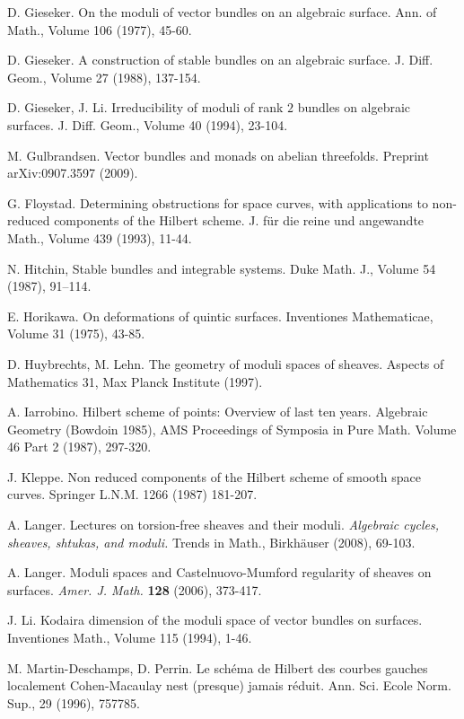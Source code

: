 \documentclass{amsart}
\theoremstyle{plain}
\numberwithin{equation}{section}
\begin{document}
\begin{thebibliography}{A}
D. Gieseker. On the moduli of vector bundles on an algebraic surface. Ann. of Math.,
Volume 106 (1977), 45-60. 

D. Gieseker. A construction of stable bundles on an algebraic surface. J. Diff. Geom.,
Volume 27 (1988), 137-154. 

D. Gieseker, J. Li. Irreducibility of moduli of rank $2$ bundles on algebraic surfaces.
J. Diff. Geom., Volume 40 (1994), 23-104. 

M. Gulbrandsen. Vector bundles and monads on abelian threefolds. Preprint arXiv:0907.3597 (2009).

G. Floystad. Determining obstructions for space curves, with applications to non-reduced components of the Hilbert scheme. 
J. f\"ur die reine und angewandte Math., Volume 439 (1993), 11-44.

N. Hitchin, Stable bundles and integrable systems. Duke Math. J., Volume 54 (1987), 91--114.

E. Horikawa. On deformations of quintic surfaces. 
Inventiones Mathematicae, Volume 31 (1975), 43-85. 

D. Huybrechts, M. Lehn. The geometry of moduli spaces of sheaves. 
Aspects of Mathematics 31, Max Planck Institute (1997).

A. Iarrobino. Hilbert scheme of points: Overview of last ten years. 
Algebraic Geometry (Bowdoin 1985), 
AMS Proceedings of Symposia in Pure Math. Volume 46 Part 2 (1987), 
297-320.

J. Kleppe. Non reduced components of the Hilbert scheme of smooth space curves.
Springer L.N.M. 1266 (1987) 181-207.

A. Langer. Lectures on torsion-free sheaves and their moduli. {\em Algebraic cycles,
sheaves, shtukas, and moduli.} {\sc Trends in Math.}, Birkh\"auser (2008), 69-103.

A. Langer. Moduli spaces and Castelnuovo-Mumford regularity of sheaves on
surfaces. {\em Amer. J. Math.} {\bf 128} (2006), 373-417.

J. Li. Kodaira dimension of the moduli space of vector bundles on surfaces. Inventiones
Math., Volume 115 (1994), 1-46. 

M. Martin-Deschamps, D. Perrin. Le sch\'ema de Hilbert des courbes gauches localement
Cohen-Macaulay nest (presque) jamais r\'eduit. Ann. Sci. Ecole Norm. Sup., 29 (1996),
757785.


\end{thebibliography}
\end{document}
